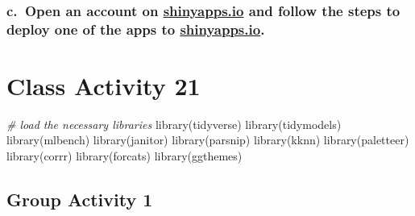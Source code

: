 \documentclass[
]{book}
\newenvironment{Shaded}{\begin{snugshade}}{\end{snugshade}}
\newcommand{\CommentTok}[1]{\textcolor[rgb]{0.56,0.35,0.01}{\textit{#1}}}
\newcommand{\FunctionTok}[1]{\textcolor[rgb]{0.00,0.00,0.00}{#1}}
\newcommand{\NormalTok}[1]{#1}
\begin{document}
\hypertarget{c.-open-an-account-on-shinyapps.io-and-follow-the-steps-to-deploy-one-of-the-apps-to-shinyapps.io.}{%
\subsection{\texorpdfstring{c.~Open an account on \href{https://www.shinyapps.io/admin/\#/dashboard}{shinyapps.io} and follow the steps to deploy one of the apps to \href{https://www.shinyapps.io/admin/\#/dashboard}{shinyapps.io}.}{c.~Open an account on shinyapps.io and follow the steps to deploy one of the apps to shinyapps.io.}}\label{c.-open-an-account-on-shinyapps.io-and-follow-the-steps-to-deploy-one-of-the-apps-to-shinyapps.io.}}

\hypertarget{class-activity-21-1}{%
\chapter{Class Activity 21}\label{class-activity-21-1}}

\begin{Shaded}
\begin{Highlighting}[]
\CommentTok{\# load the necessary libraries}
\FunctionTok{library}\NormalTok{(tidyverse) }
\FunctionTok{library}\NormalTok{(tidymodels)}
\FunctionTok{library}\NormalTok{(mlbench)     }
\FunctionTok{library}\NormalTok{(janitor)}
\FunctionTok{library}\NormalTok{(parsnip)}
\FunctionTok{library}\NormalTok{(kknn)}
\FunctionTok{library}\NormalTok{(paletteer)}
\FunctionTok{library}\NormalTok{(corrr)}
\FunctionTok{library}\NormalTok{(forcats)}
\FunctionTok{library}\NormalTok{(ggthemes)}
\end{Highlighting}
\end{Shaded}

\hypertarget{group-activity-1-6}{%
\section{Group Activity 1}\label{group-activity-1-6}}
\end{document}

